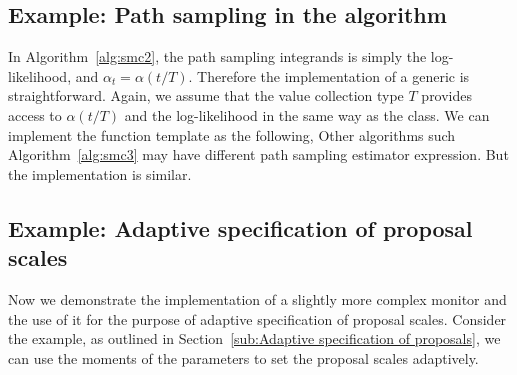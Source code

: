 \subsection{Example: Path sampling in the \smc[2] algorithm}
\label{sub:Example: Path sampling with the SMC2 algorithm}

In Algorithm~\ref{alg:smc2}, the path sampling integrands is simply the
log-likelihood, and $\alpha_t = \alpha(t/T)$. Therefore the implementation of
a generic  is straightforward. Again, we assume that the
value collection type $T$ provides access to $\alpha(t/T)$ and the
log-likelihood in the same way as the  class. We can implement
the function template as the following,
Other \smc algorithms such Algorithm~\ref{alg:smc3} may have different path
sampling estimator expression. But the implementation is similar.

\subsection{Example: Adaptive specification of proposal scales}
\label{sub:Example: Adaptive specification of proposal scales}

Now we demonstrate the implementation of a slightly more complex monitor and
the use of it for the purpose of adaptive specification of proposal scales.
Consider the \gmm example, as outlined in Section~\ref{sub:Adaptive
  specification of proposals}, we can use the moments of the parameters to set
the proposal scales adaptively.

